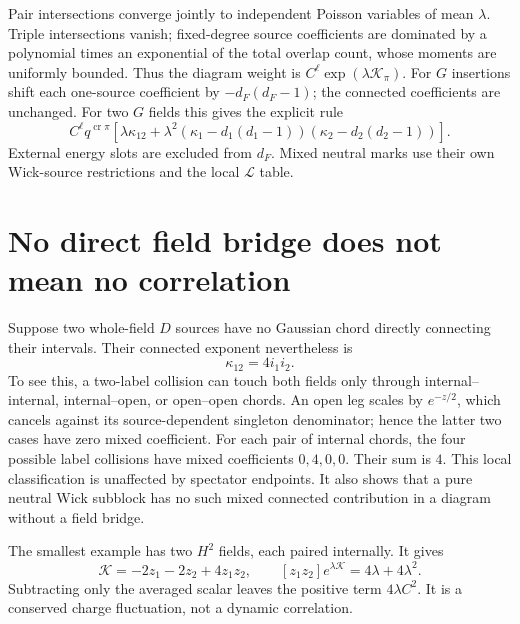 \documentclass[11pt]{article}
\newcommand{\LL}{\mathcal L}
\newcommand{\crs}{\operatorname{cr}}
\begin{document}
Pair intersections converge jointly to independent Poisson variables
of mean $\lambda$. Triple intersections vanish; fixed-degree source
coefficients are dominated by a polynomial times an exponential of
the total overlap count, whose moments are uniformly bounded.
Thus the diagram weight is $C^\ell\exp(\lambda\mathcal K_\pi)$.
For $G$ insertions shift each one-source coefficient by
$-d_F(d_F-1)$; the connected coefficients are unchanged. For two
$G$ fields this gives the explicit rule
\begin{equation}
 C^\ell q^{\crs\pi}
 \left[\lambda\kappa_{12}+
 \lambda^2(\kappa_1-d_1(d_1-1))(\kappa_2-d_2(d_2-1))\right].
 \label{eq:wholeweight}
\end{equation}
External energy slots are excluded from $d_F$. Mixed neutral marks
use their own Wick-source restrictions and the local $\LL$ table.

\newpage
\section{No direct field bridge does not mean no correlation}
Suppose two whole-field $D$ sources have no Gaussian chord directly
connecting their intervals. Their connected exponent nevertheless is
\begin{equation}
 \boxed{\ \kappa_{12}=4i_1i_2.\ }\label{eq:b0}
\end{equation}
To see this, a two-label collision can touch both fields only through
internal--internal, internal--open, or open--open chords. An open
leg scales by $e^{-z/2}$, which cancels against its source-dependent
singleton denominator; hence the latter two cases have zero mixed
coefficient. For each pair of internal chords, the four possible
label collisions have mixed coefficients $0,4,0,0$. Their sum is $4$.
This local classification is unaffected by spectator endpoints.
It also shows that a pure neutral Wick subblock has no such mixed
connected contribution in a diagram without a field bridge.

The smallest example has two $H^2$ fields, each paired internally.
It gives
\begin{equation}
 \mathcal K=-2z_1-2z_2+4z_1z_2,
 \qquad [z_1z_2]e^{\lambda\mathcal K}=4\lambda+4\lambda^2.
 \label{eq:counterexample}
\end{equation}
Subtracting only the averaged scalar leaves the positive term
$4\lambda C^2$. It is a conserved charge fluctuation, not a dynamic
correlation.
\end{document}
